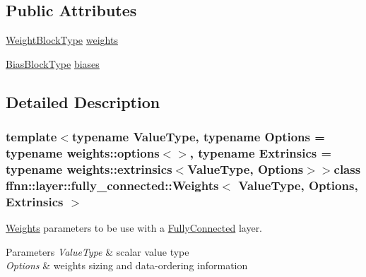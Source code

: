 \subsection*{Public Attributes}
\begin{DoxyCompactItemize}
\item 
\hyperlink{classffnn_1_1layer_1_1fully__connected_1_1_weights_a60cdcf8a80260e8558f1e64f8a0a8218}{Weight\-Block\-Type} \hyperlink{classffnn_1_1layer_1_1fully__connected_1_1_weights_a9baed4c318d41e712f821c02c4cb4c4a}{weights}
\item 
\hyperlink{classffnn_1_1layer_1_1fully__connected_1_1_weights_a6f5ad97bf46dac9d55752b5117768957}{Bias\-Block\-Type} \hyperlink{classffnn_1_1layer_1_1fully__connected_1_1_weights_ac2ab5399d4525f4b75959a9d8d7f994a}{biases}
\end{DoxyCompactItemize}


\subsection{Detailed Description}
\subsubsection*{template$<$typename Value\-Type, typename Options = typename weights\-::options$<$$>$, typename Extrinsics = typename weights\-::extrinsics$<$\-Value\-Type, Options$>$$>$class ffnn\-::layer\-::fully\-\_\-connected\-::\-Weights$<$ Value\-Type, Options, Extrinsics $>$}

\hyperlink{classffnn_1_1layer_1_1fully__connected_1_1_weights}{Weights} parameters to be use with a \hyperlink{classffnn_1_1layer_1_1_fully_connected}{Fully\-Connected} layer. 


\begin{DoxyParams}{Parameters}
{\em Value\-Type} & scalar value type \\
\hline
{\em Options} & weights sizing and data-\/ordering information \\
\hline
\end{DoxyParams}


